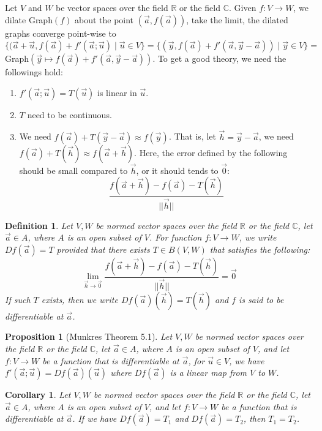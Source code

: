 \documentclass[15pt]{book}
\theoremstyle{break}
\theoremstyle{break}
\newtheorem{prop}[lem]{Proposition}
\newtheorem{corT}[lem]{Corollary}
\newtheorem{defn}{Definition}[corL]
\newcommand{\R}{\mathbb{R}}
\newcommand{\Complex}{\mathbb{C}}
\begin{document}
\newpage
Let $V$ and $W$ be vector spaces over the field $\R$ or the field $\Complex$. Given $f:V \to W$, we dilate Graph$(f)$ about the point $(\vec{a},f(\vec{a}))$, take the limit, the dilated graphs converge point-wise to $\{(\vec{a}+\vec{u},f(\vec{a})+f'(\vec{a};\vec{u})\mid \vec{u}\in V\} = \{(\vec{y}, f(\vec{a})+f'(\vec{a},\vec{y}-\vec{a}))\mid \vec{y}\in V\} =\ $Graph$(\vec{y}\mapsto f(\vec{a})+f'(\vec{a},\vec{y}-\vec{a}))$. To get a good theory, we need the followings hold: 
\begin{enumerate}[topsep=3pt,itemsep=-1ex,partopsep=1ex,parsep=1ex]
\item $f'(\vec{a};\vec{u}) = T(\vec{u})$ is linear in $\vec{u}$.
\item $T$ need to be continuous.
\item We need $f(\vec{a}) + T(\vec{y}-\vec{a}) \approx f(\vec{y})$. That is, let $\vec{h} = \vec{y}-\vec{a}$, we need $f(\vec{a})+T(\vec{h}) \approx f(\vec{a}+\vec{h})$. Here, the error defined by the following should be small compared to $\vec{h}$, or it should tends to $\vec{0}$:  $$\frac{f(\vec{a}+\vec{h}) - f(\vec{a}) - T(\vec{h})}{||\vec{h}||}$$
\end{enumerate}




\begin{defn}
Let $V,W$ be normed vector spaces over the field $\R$ or the field $\Complex$, let $\vec{a}\in A$, where $A$ is an open subset of $V$. For function $f:V \to W$, we write $Df(\vec{a}) = T$ provided that there exists $T \in B(V,W)$ that satisfies the following: $$\lim_{\vec{h}\to \vec{0}} \frac{f(\vec{a}+\vec{h})-f(\vec{a})-T(\vec{h})}{||\vec{h}||} = \vec{0}$$If such $T$ exists, then we write $Df(\vec{a})(\vec{h})=T(\vec{h})$ and $f$ is said to be differentiable at $\vec{a}$.
\end{defn}


\begin{prop}[Munkres Theorem 5.1]
Let $V,W$ be normed vector spaces over the field $\R$ or the field $\Complex$, let $\vec{a}\in A$, where $A$ is an open subset of $V$, and let $f:V \to W$ be a function that is differentiable at $\vec{a}$, for $\vec{u}\in V$, we have $f'(\vec{a};\vec{u}) = Df(\vec{a})(\vec{u})$ where $Df(\vec{a})$ is a linear map from $V$ to $W$.
\end{prop}


\begin{corT}
Let $V,W$ be normed vector spaces over the field $\R$ or the field $\Complex$, let $\vec{a}\in A$, where $A$ is an open subset of $V$, and let $f:V \to W$ be a function that is differentiable at $\vec{a}$. If we have $Df(\vec{a}) = T_1$ and $Df(\vec{a}) = T_2$, then $T_1 = T_2$.
\end{corT}
\end{document}
